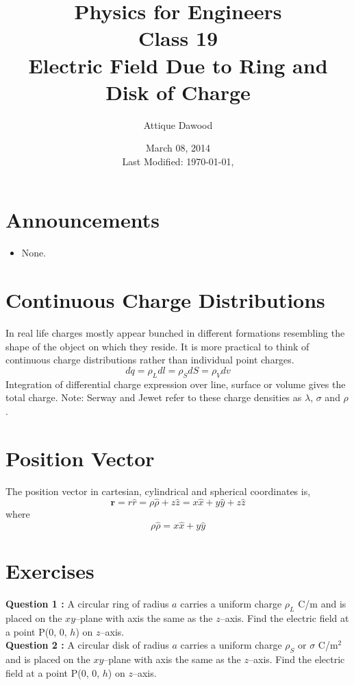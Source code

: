\documentclass[12pt,a4paper]{article}
\title{\vspace{-3cm}Physics for Engineers\\Class 19\\Electric Field Due to Ring and Disk of Charge}
\author{Attique Dawood}
\date{March 08, 2014\\[0.2cm] Last Modified: \today, \currenttime}
\begin{document}
\maketitle
\section{Announcements}
\begin{itemize}
\item None.
\end{itemize}
\section{Continuous Charge Distributions}
In real life charges mostly appear bunched in different formations resembling the shape of the object on which they reside. It is more practical to think of continuous charge distributions rather than individual point charges.
\begin{equation}
dq=\rho_Ldl=\rho_SdS=\rho_Vdv
\end{equation}
Integration of differential charge expression over line, surface or volume gives the total charge.
Note: Serway and Jewet \cite{Serway} refer to these charge densities as $\lambda$, $\sigma$ and $\rho$.
\section{Position Vector}
The position vector in cartesian, cylindrical and spherical coordinates is,
\begin{equation}
\textbf{r}=r\hat r=\rho\hat{\rho}+z\hat z=x\hat x+y\hat y+z\hat z
\end{equation}
where
\begin{equation}
\rho\hat{\rho}=x\hat x+y\hat y
\end{equation}
\section{Exercises}
\noindent\textbf{Question 1 \cite[Example 4.4, page 117]{Sadiku}\cite[Example 23.8, page 721]{Serway}:} A circular ring of radius $a$ carries a uniform charge $\rho_L$ C/m and is placed on the $xy$--plane with axis the same as the $z$--axis. Find the electric field at a point P(0, 0, $h$) on $z$--axis.\\[0.2cm]
\noindent\textbf{Question 2 \cite[Practice Exercise 4.4, page 119]{Sadiku}\cite[Example 23.9, page 722]{Serway}:} A circular disk of radius $a$ carries a uniform charge $\rho_S$ or $\sigma$ C/m$^2$ and is placed on the $xy$--plane with axis the same as the $z$--axis. Find the electric field at a point P(0, 0, $h$) on $z$--axis.


\end{document}
